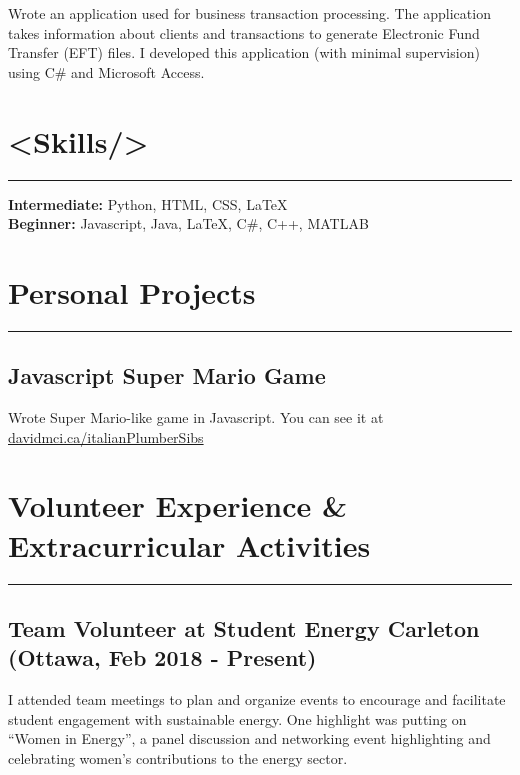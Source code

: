 \documentclass[11pt]{article}
\begin{document}
		\noindent Wrote an application used for business transaction processing. The application takes information about clients and transactions to generate Electronic Fund Transfer (EFT) files. I developed this application (with minimal supervision) using C\# and Microsoft Access.
		
	
	
	\section{\textless Skills/\textgreater}
	\hrule \hfill %

	\noindent \textbf{Intermediate: } Python, HTML, CSS, \LaTeX
	\\
	\noindent \textbf{Beginner: } Javascript, Java, \LaTeX , C\#, C++, MATLAB
		
	
	\section{Personal Projects}
	\hrule \hfill %
	\subsection{Javascript Super Mario Game}	
	\noindent Wrote Super Mario-like game in Javascript. You can see it at \href{http://davidmci.ca/italianPlumberSibs}{davidmci.ca/italianPlumberSibs}

	
	\section{Volunteer Experience \& Extracurricular Activities}
	\hrule \hfill
	\iffalse	
	\subsection{Director of Silly Walks at Student Energy Carleton (Ottawa, Jan 2019 - Present)}
	
	\noindent Nam dui ligula, fringilla a, euismod sodales, sollicitudin vel, wisi. Morbi auctor lorem non justo. Nam lacus libero, pretium at, lobortis vitae, ultricies et, tellus. Donec aliquet, tortor sed accumsan bibendum,erat ligula aliquet magna, vitae ornare odio metus a mi. %
	
	\fi
	
	\subsection{Team Volunteer at Student Energy Carleton (Ottawa, Feb 2018 - Present)}
\noindent I attended team meetings to plan and organize events to encourage and facilitate student engagement with sustainable energy. One highlight was putting on “Women in Energy”, a panel discussion and networking event highlighting and celebrating women’s contributions to the energy sector.
	
\end{document}
